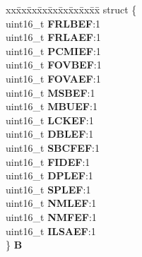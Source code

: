 \begin{DoxyCompactItemize}
\begin{tabbing}
\end{tabbing}\item 
\mbox{\label{unionuCHIERFR_a4f59440b45d5b909a1dedbcba2608b5f}} 
\begin{tabbing}
xx\=xx\=xx\=xx\=xx\=xx\=xx\=xx\=xx\=\kill
struct \{\\
\>uint16\_t {\bfseries FRLBEF}:1\\
\>uint16\_t {\bfseries FRLAEF}:1\\
\>uint16\_t {\bfseries PCMIEF}:1\\
\>uint16\_t {\bfseries FOVBEF}:1\\
\>uint16\_t {\bfseries FOVAEF}:1\\
\>uint16\_t {\bfseries MSBEF}:1\\
\>uint16\_t {\bfseries MBUEF}:1\\
\>uint16\_t {\bfseries LCKEF}:1\\
\>uint16\_t {\bfseries DBLEF}:1\\
\>uint16\_t {\bfseries SBCFEF}:1\\
\>uint16\_t {\bfseries FIDEF}:1\\
\>uint16\_t {\bfseries DPLEF}:1\\
\>uint16\_t {\bfseries SPLEF}:1\\
\>uint16\_t {\bfseries NMLEF}:1\\
\>uint16\_t {\bfseries NMFEF}:1\\
\>uint16\_t {\bfseries ILSAEF}:1\\
\} {\bfseries B}\\


\end{tabbing}
\end{DoxyCompactItemize}
